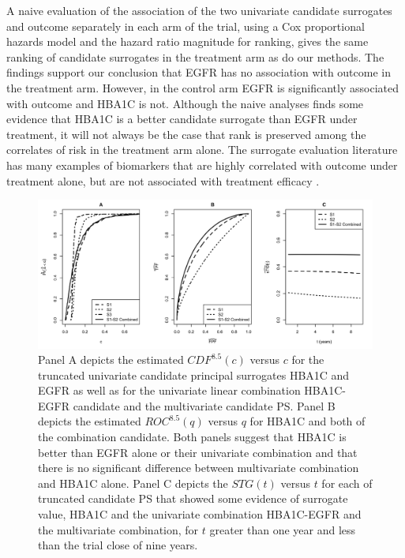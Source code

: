 \documentclass[times, doublespace]{simauth}
\begin{document}
A naive evaluation of the association of the two univariate candidate surrogates and outcome separately in each arm of the trial, using a Cox proportional hazards model and the hazard ratio magnitude for ranking, gives the same ranking of candidate surrogates in the treatment arm as do our methods. The findings support our conclusion that EGFR has no association with outcome in the treatment arm. However, in the control arm EGFR is significantly associated with outcome and HBA1C is not. Although the naive analyses finds some evidence that HBA1C is a better candidate surrogate than EGFR under treatment, it will not always be the case that rank is preserved among the correlates of risk in the treatment arm alone. The surrogate evaluation literature has many examples of biomarkers that are highly correlated with outcome under treatment alone, but are not associated with treatment efficacy \citep{flemming96}.  

\begin{figure}
\begin{center}
\includegraphics[width=.9\textwidth]{dcct-example-figure-2014-7-16.pdf}
\end{center}
\caption{Panel A depicts the estimated $CDF^{8.5}(c)$ versus $c$ for the truncated univariate candidate principal surrogates HBA1C and EGFR as well as for the univariate linear combination HBA1C-EGFR candidate and the multivariate candidate PS. Panel B depicts the estimated $ROC^{8.5}(q)$ versus $q$ for HBA1C and both of the combination candidate. Both panels suggest that HBA1C is better than EGFR alone or their univariate combination and that there is no significant difference between multivariate combination and HBA1C alone. Panel C depicts the $STG(t)$ versus $t$ for each of truncated candidate PS that showed some evidence of surrogate value, HBA1C and the univariate combination HBA1C-EGFR and the multivariate combination, for $t$ greater than one year and less than the trial close of nine years. \label{exp}}
\end{figure}
\end{document}
